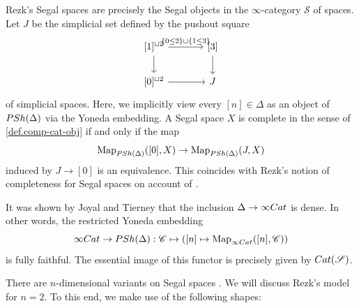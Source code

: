\documentclass[a4paper, 11pt]{amsart}
\numberwithin{theorem}{section}
\theoremstyle{definition}
\newcommand{\cat}[1]{\textup{#1}}
\newcommand{\map}{\mathrm{Map}}
\newcommand{\Cat}{\cat{Cat}}
\renewcommand{\S}{\mathscr{S}}
\newcommand{\C}{\mathscr{C}}
\newcommand{\PSh}{\cat{PSh}}
\begin{document}
\begin{example}\label{ex.segal-spaces}
	Rezk's Segal spaces \cite{RezkSeg} are precisely the Segal objects in the $\infty$-category $\S$ of spaces. 
	Let $J$ be the simplicial set defined by the pushout square 
\[
	\begin{tikzcd}[column sep = large]
	{[1]^{\sqcup 2}} \arrow[r, "\{0\leq 2\} \sqcup \{1 \leq 3\}"]\arrow[d] & {[3]} \arrow[d] \\
	{[0]^{\sqcup 2}} \arrow[r] & J
	\end{tikzcd}
\] 
of simplicial spaces. Here, we implicitly view every $[n] \in \Delta$ as an object of $\PSh(\Delta)$ via the Yoneda embedding. A Segal space $X$ is complete in the sense of \cref{def.comp-cat-obj} if and only if the map 
$$
\map_{\PSh(\Delta)}([0], X) \rightarrow \map_{\PSh(\Delta)}(J,X)
$$
induced by $J \rightarrow [0]$ is an equivalence. This coincides with Rezk's notion of completeness for Segal spaces on account of \cite[Proposition 11.1]{RezkSeg}.

It was shown by Joyal and Tierney \cite{JoyalTierney} that the inclusion $\Delta \to \infty\Cat$ is dense. 
In other words, the restricted Yoneda embedding
$$
	\infty\Cat \rightarrow \PSh(\Delta) : \C \mapsto ([n] \mapsto \map_{\infty\Cat}([n], \C))
	$$
	is fully faithful. The essential image of this functor is precisely given by $\Cat(\S)$.
\end{example}

There are $n$-dimensional variants on Segal spaces \cite{BarwickPhD} \cite{RezkTheta}. We will discuss 
Rezk's model for $n=2$. To this end, we make use of the following shapes: 
\end{document}
